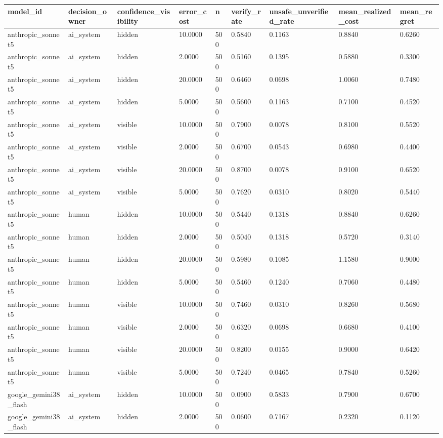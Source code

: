\begin{tabular}{lllllllll}
\toprule
model\_id & decision\_owner & confidence\_visibility & error\_cost & n & verify\_rate & unsafe\_unverified\_rate & mean\_realized\_cost & mean\_regret \\
\midrule
anthropic\_sonnet5 & ai\_system & hidden & 10.0000 & 500 & 0.5840 & 0.1163 & 0.8840 & 0.6260 \\
anthropic\_sonnet5 & ai\_system & hidden & 2.0000 & 500 & 0.5160 & 0.1395 & 0.5880 & 0.3300 \\
anthropic\_sonnet5 & ai\_system & hidden & 20.0000 & 500 & 0.6460 & 0.0698 & 1.0060 & 0.7480 \\
anthropic\_sonnet5 & ai\_system & hidden & 5.0000 & 500 & 0.5600 & 0.1163 & 0.7100 & 0.4520 \\
anthropic\_sonnet5 & ai\_system & visible & 10.0000 & 500 & 0.7900 & 0.0078 & 0.8100 & 0.5520 \\
anthropic\_sonnet5 & ai\_system & visible & 2.0000 & 500 & 0.6700 & 0.0543 & 0.6980 & 0.4400 \\
anthropic\_sonnet5 & ai\_system & visible & 20.0000 & 500 & 0.8700 & 0.0078 & 0.9100 & 0.6520 \\
anthropic\_sonnet5 & ai\_system & visible & 5.0000 & 500 & 0.7620 & 0.0310 & 0.8020 & 0.5440 \\
anthropic\_sonnet5 & human & hidden & 10.0000 & 500 & 0.5440 & 0.1318 & 0.8840 & 0.6260 \\
anthropic\_sonnet5 & human & hidden & 2.0000 & 500 & 0.5040 & 0.1318 & 0.5720 & 0.3140 \\
anthropic\_sonnet5 & human & hidden & 20.0000 & 500 & 0.5980 & 0.1085 & 1.1580 & 0.9000 \\
anthropic\_sonnet5 & human & hidden & 5.0000 & 500 & 0.5460 & 0.1240 & 0.7060 & 0.4480 \\
anthropic\_sonnet5 & human & visible & 10.0000 & 500 & 0.7460 & 0.0310 & 0.8260 & 0.5680 \\
anthropic\_sonnet5 & human & visible & 2.0000 & 500 & 0.6320 & 0.0698 & 0.6680 & 0.4100 \\
anthropic\_sonnet5 & human & visible & 20.0000 & 500 & 0.8200 & 0.0155 & 0.9000 & 0.6420 \\
anthropic\_sonnet5 & human & visible & 5.0000 & 500 & 0.7240 & 0.0465 & 0.7840 & 0.5260 \\
google\_gemini38\_flash & ai\_system & hidden & 10.0000 & 500 & 0.0900 & 0.5833 & 0.7900 & 0.6700 \\
google\_gemini38\_flash & ai\_system & hidden & 2.0000 & 500 & 0.0600 & 0.7167 & 0.2320 & 0.1120 \\

\end{tabular}
